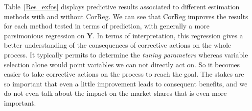 \documentclass[11pt,a4paper]{article}
\begin{document}
%
%	
%
%		
%		
		
\vspace{3mm}
	
	
Table~\ref{Res_exfos} displays predictive results associated to different estimation methods with and without {\sc CorReg}. We can see that {\sc CorReg} improves the results for each method tested in terms of prediction, with generally a more parsimonious regression on $\boldsymbol{Y}$. In terms of interpretation, this regression gives a better understanding of the consequences of corrective actions on the whole process. It typically permits to determine the \textit{tuning parameters} whereas variable selection alone would point variables we can not directly act on.	So it becomes easier to take corrective actions on the process to reach the goal. The stakes are so important that even a little improvement leads to consequent benefits, and we do not even talk about the impact on the market shares that is even more important.
		
\end{document}
